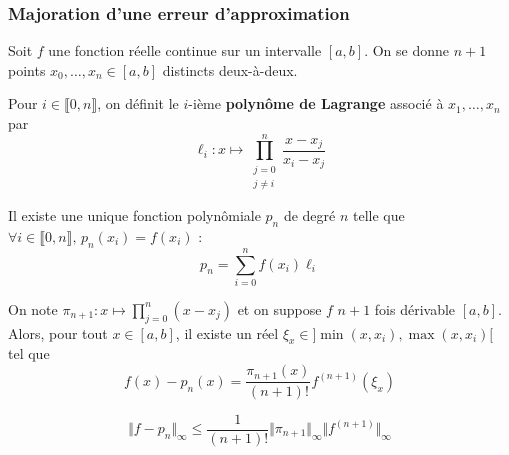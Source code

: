 	\subsubsection{Majoration d'une erreur d'approximation}
	
	
	Soit $f$ une fonction réelle continue sur un intervalle $[a,b]$. On se donne $n+1$ points $x_0, \dots, x_n \in [a,b]$ distincts deux-à-deux.
	
	\begin{definition}
		Pour $i \in \llbracket 0, n \rrbracket$, on définit le $i$-ième \textbf{polynôme de Lagrange} associé à $x_1, \dots, x_n$ par
		\[ \ell_i : x \mapsto \prod_{\substack{j=0\\j \neq i}}^n \frac{x-x_j}{x_i-x_j} \]
	\end{definition}
	
	\begin{theorem}
		Il existe une unique fonction polynômiale $p_n$ de degré $n$ telle que $\forall i \in \llbracket 0, n \rrbracket, \, p_n(x_i) = f(x_i)$ :
		\[ p_n = \sum_{i=0}^n f(x_i) \ell_i \]
	\end{theorem}
	
	\begin{theorem}
		On note $\pi_{n+1} : x \mapsto \prod_{j=0}^{n} (x-x_j)$ et on suppose $f$ $n+1$ fois dérivable $[a,b]$. Alors, pour tout $x \in [a,b]$, il existe un réel $\xi_x \in ]\min(x,x_i),\max(x,x_i)[$ tel que
		\[ f(x)-p_n(x) = \frac{\pi_{n+1}(x)}{(n+1)!} f^{(n+1)}(\xi_x) \]
	\end{theorem}
	
	\begin{corollary}
		\[ \Vert f - p_n \Vert_\infty \leq \frac{1}{(n+1)!} \Vert \pi_{n+1} \Vert_\infty \Vert f^{(n+1)} \Vert_\infty \]
	\end{corollary}
	
	
